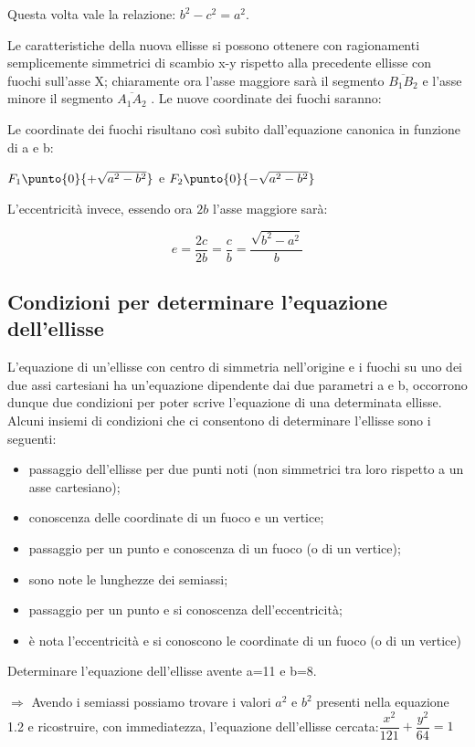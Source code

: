 Questa volta vale la relazione: $b^{2}-c^{2}=a^{2}$.

Le caratteristiche della nuova ellisse si possono ottenere con ragionamenti 
semplicemente simmetrici di scambio x-y rispetto alla precedente ellisse 
con fuochi sull'asse X; chiaramente ora l'asse maggiore sarà il segmento 
$\overline{B_{1}B_{2}}$      e l'asse minore il segmento 
$\overline{A_{1}A_{2}}$ .
Le nuove coordinate dei fuochi saranno:

Le coordinate dei fuochi risultano così subito dall'equazione canonica in 
funzione di a e b:

\(F_{1} \punto{0}{+\sqrt{a^{2}-b^{2}}}\) e 
\(F_{2} \punto{0}{-\sqrt{a^{2}-b^{2}}}\)

L'eccentricità invece, essendo ora \(2b\) l'asse maggiore sarà:

\begin{equation}
e=\dfrac{2c}{2b}=\dfrac{c}{b}=\dfrac{\sqrt{b^{2}-a^{2}}}{b}
\end{equation}

\subsection{Condizioni per determinare l'equazione dell'ellisse}

L'equazione di un'ellisse con centro di simmetria nell'origine e i fuochi 
su uno dei due assi cartesiani ha un'equazione dipendente dai due parametri 
a e b, occorrono dunque due condizioni per poter scrive l'equazione di una 
determinata ellisse.
Alcuni insiemi di condizioni che ci consentono di determinare l'ellisse 
sono i seguenti:
\begin{itemize} [noitemsep]
  \item passaggio dell'ellisse per due punti noti (non simmetrici tra 
loro rispetto a un asse cartesiano);
  \item conoscenza delle coordinate di un fuoco e un vertice;
  \item passaggio per un punto e conoscenza di un fuoco (o di un 
vertice);
  \item sono note le lunghezze dei semiassi;
  \item passaggio per un punto e si conoscenza dell'eccentricità;
  \item è nota l'eccentricità e si conoscono le coordinate di un 
fuoco (o di un vertice)
\end{itemize}

\begin{esempio}
Determinare l'equazione dell'ellisse avente a=11 e b=8.

$\Rightarrow$ Avendo i semiassi possiamo trovare i valori $ a^{2} $ e $ 
b^{2} $ presenti nella equazione 1.2 e ricostruire, con immediatezza, 
l'equazione dell'ellisse cercata:\quad $ 
\dfrac{x^{2}}{121}+\dfrac{y^{2}}{64}=1$
\end{esempio}

